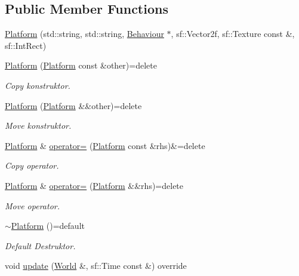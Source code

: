 \subsection*{Public Member Functions}
\begin{DoxyCompactItemize}
\item 
\hyperlink{classPlatform_a87ebc22e56d673fede211c6824f015f6}{Platform} (std\+::string, std\+::string, \hyperlink{classBehaviour}{Behaviour} $\ast$, sf\+::\+Vector2f, sf\+::\+Texture const \&, sf\+::\+Int\+Rect)
\item 
\hyperlink{classPlatform_a187acbd90dbed1c028d640d19d69fedd}{Platform} (\hyperlink{classPlatform}{Platform} const \&other)=delete
\begin{DoxyCompactList}\small\item\em Copy konstruktor. \end{DoxyCompactList}\item 
\hyperlink{classPlatform_a62adfd45ef427798c713064cd54b926b}{Platform} (\hyperlink{classPlatform}{Platform} \&\&other)=delete
\begin{DoxyCompactList}\small\item\em Move konstruktor. \end{DoxyCompactList}\item 
\hyperlink{classPlatform}{Platform} \& \hyperlink{classPlatform_a80d5d52e630409f5ae9a1cd98720faf2}{operator=} (\hyperlink{classPlatform}{Platform} const \&rhs)\&=delete
\begin{DoxyCompactList}\small\item\em Copy operator. \end{DoxyCompactList}\item 
\hyperlink{classPlatform}{Platform} \& \hyperlink{classPlatform_af57a590654b1c1c2432e79237de854f9}{operator=} (\hyperlink{classPlatform}{Platform} \&\&rhs)=delete
\begin{DoxyCompactList}\small\item\em Move operator. \end{DoxyCompactList}\item 
\hyperlink{classPlatform_ab1def8463428a10d2fe399fd695118f9}{$\sim$\+Platform} ()=default
\begin{DoxyCompactList}\small\item\em Default Destruktor. \end{DoxyCompactList}\item 
void \hyperlink{classPlatform_ad756e0494312cdd8956af8bee6afbb0f}{update} (\hyperlink{classWorld}{World} \&, sf\+::\+Time const \&) override

\end{DoxyCompactItemize}
